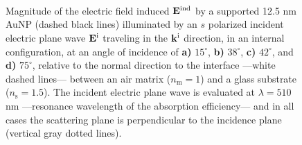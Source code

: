 {\begin{figure}[t!]\centering
   \def\svgwidth{.75\textwidth}
   \footnotesize
   \\[-32.6em]
   \hspace*{-.25\textwidth}
       \begin{subfigure}{.25\textwidth}\caption{ } \label{sfig:Near:SuppObl:s:15}\end{subfigure}%
       \begin{subfigure}{.34\textwidth}\caption{ }\label{sfig:Near:SuppObl:s:38}\end{subfigure}\\[13em]
    \hspace*{-.25\textwidth}
       \begin{subfigure}{.25\textwidth}\caption{ } \label{sfig:Near:SuppObl:s:42}\end{subfigure}%
       \begin{subfigure}{.34\textwidth}\caption{ }\label{sfig:Near:SuppObl:s:75}\end{subfigure}\\[15em]
\caption[Induced Electric Field of a 12.5 nm Au NP on substrate illuminated at oblique incidence with a $s$ polarized electric field]{%
Magnitude of the electric field induced $\vb{E}^\text{ind}$ by a supported 12.5 nm AuNP (dashed black lines) illuminated by an $s$ polarized incident electric plane wave $\vb{E}^\text{i}$ traveling in the $\vb{k}^\text{i}$ direction, in an internal configuration, at an angle of incidence of \textbf{a)} $15^\circ$, \textbf{b)} $38^\circ$, \textbf{c)} $42^\circ$, and \textbf{d)} $75^\circ$, relative to the normal direction to the interface ---white dashed lines--- between an air matrix ($n_\text{m} = 1$) and a glass substrate ($n_\text{s} = 1.5$). The incident electric plane wave is evaluated at $\lambda = 510$ nm ---resonance wavelength of the absorption efficiency--- and in all cases the scattering plane is perpendicular to the incidence plane (vertical gray dotted lines).
}
 \label{fig:Near:SuppObl:s}
 \end{figure}

}
